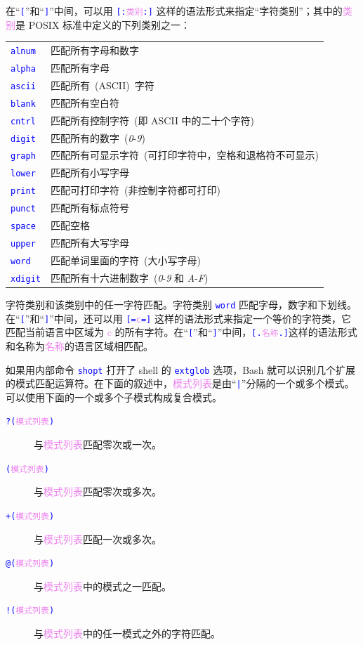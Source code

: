 \documentclass[openany,notitlepage]{book}
\newcommand{\code}[1]{\textcolor{blue}{{\tt #1}}}
\newcommand{\hl}[1]{{\sl #1}}
\newcommand{\hs}[1]{{\textcolor{violet}{#1}}}
\begin{document}
\begin{CJK}{UTF8}{song}
\begin{description}
    在``\code{[}''和``\code{]}''中间，可以用 \code{[:\hs{类别}:]} 这样的语法形式来指定``字符类别''；其中的\hs{类别}是 POSIX 标准中定义的下列类别之一：
    \begin{table}[H]
    \centering
    \begin{tabular}{ll}
        \code{alnum} & 匹配所有字母和数字 \\
        \code{alpha} & 匹配所有字母 \\
        \code{ascii} & 匹配所有~(ASCII)~字符 \\
        \code{blank} & 匹配所有空白符 \\
        \code{cntrl} & 匹配所有控制字符~(即 ASCII 中的二十个字符) \\
        \code{digit} & 匹配所有的数字~(\hl{0}-\hl{9}) \\
        \code{graph} & 匹配所有可显示字符~(可打印字符中，空格和退格符不可显示) \\
        \code{lower} & 匹配所有小写字母 \\
        \code{print} & 匹配可打印字符~(非控制字符都可打印) \\
        \code{punct} & 匹配所有标点符号 \\
        \code{space} & 匹配空格 \\
        \code{upper} & 匹配所有大写字母 \\
        \code{word}  & 匹配单词里面的字符~(大小写字母) \\
        \code{xdigit} & 匹配所有十六进制数字~(\hl{0}-\hl{9} 和 \hl{A}-\hl{F})~
    \end{tabular}
    \end{table}
    字符类别和该类别中的任一字符匹配。字符类别 \code{word} 匹配字母，数字和下划线。在``\code{[}''和``\code{]}''中间，还可以用 \code{[=\hs{c}=]} 这样的语法形式来指定一个等价的字符类，它匹配当前语言中区域为 \hs{c} 的所有字符。在``\code{[}''和``\code{]}''中间，\code{[.\hs{名称}.]}这样的语法形式和名称为\hs{名称}的语言区域相匹配。
\end{description}
如果用内部命令 \code{shopt} 打开了 shell 的 \code{extglob} 选项，Bash 就可以识别几个扩展的模式匹配运算符。在下面的叙述中，\hs{模式列表}是由``\code{|}''分隔的一个或多个模式。可以使用下面的一个或多个子模式构成复合模式。
\begin{description}
    \item[\code{?(\hs{模式列表})}] 与\hs{模式列表}匹配零次或一次。
    \item[\code{*(\hs{模式列表})}] 与\hs{模式列表}匹配零次或多次。
    \item[\code{+(\hs{模式列表})}] 与\hs{模式列表}匹配一次或多次。
    \item[\code{@(\hs{模式列表})}] 与\hs{模式列表}中的模式之一匹配。
    \item[\code{!(\hs{模式列表})}] 与\hs{模式列表}中的任一模式之外的字符匹配。
\end{description}


\end{CJK}
\end{document}

